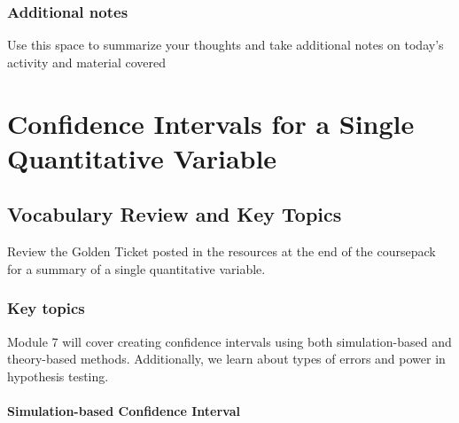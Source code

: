 \documentclass[
]{report}
\begin{document}
\subsection{Additional notes}\label{additional-notes-2}

Use this space to summarize your thoughts and take additional notes on today's activity and material covered

\newpage

\chapter{Confidence Intervals for a Single Quantitative Variable}\label{confidence-intervals-for-a-single-quantitative-variable}

\section{Vocabulary Review and Key Topics}\label{vocabulary-review-and-key-topics-1}

Review the Golden Ticket posted in the resources at the end of the coursepack for a summary of a single quantitative variable.

\subsection{Key topics}\label{key-topics-1}

Module 7 will cover creating confidence intervals using both simulation-based and theory-based methods. Additionally, we learn about types of errors and power in hypothesis testing.

\subsubsection*{Simulation-based Confidence Interval}\label{simulation-based-confidence-interval}
\end{document}
